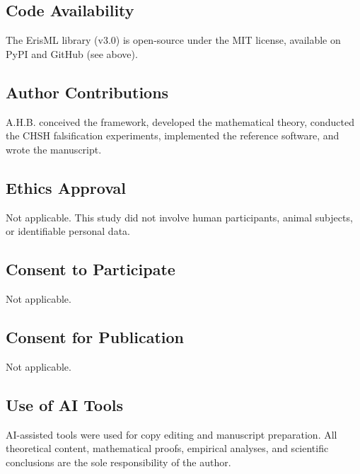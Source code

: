 \documentclass[12pt]{article}
\begin{document}
\subsection*{Code Availability}
The ErisML library (v3.0) is open-source under the MIT license, available on PyPI and GitHub (see above).

\subsection*{Author Contributions}
A.H.B. conceived the framework, developed the mathematical theory, conducted the CHSH falsification experiments, implemented the reference software, and wrote the manuscript.

\subsection*{Ethics Approval}
Not applicable. This study did not involve human participants, animal subjects, or identifiable personal data.

\subsection*{Consent to Participate}
Not applicable.

\subsection*{Consent for Publication}
Not applicable.

\subsection*{Use of AI Tools}
AI-assisted tools were used for copy editing and manuscript preparation. All theoretical content, mathematical proofs, empirical analyses, and scientific conclusions are the sole responsibility of the author.
\end{document}

